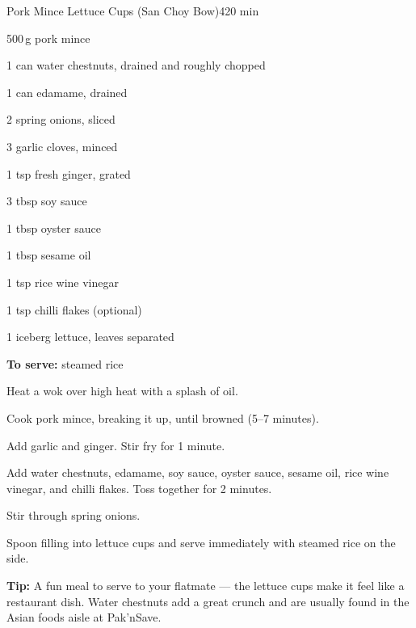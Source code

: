 \begin{recipebox}{Pork Mince Lettuce Cups (San Choy Bow)}{4}{20 min}
\begin{ingredients}
  \item 500\,g pork mince
  \item 1 can water chestnuts, drained and roughly chopped
  \item 1 can edamame, drained
  \item 2 spring onions, sliced
  \item 3 garlic cloves, minced
  \item 1 tsp fresh ginger, grated
  \item 3 tbsp soy sauce
  \item 1 tbsp oyster sauce
  \item 1 tbsp sesame oil
  \item 1 tsp rice wine vinegar
  \item 1 tsp chilli flakes (optional)
  \item 1 iceberg lettuce, leaves separated
  \item \textbf{To serve:} steamed rice
\end{ingredients}

\begin{method}
  \item Heat a wok over high heat with a splash of oil.
  \item Cook pork mince, breaking it up, until browned (5--7 minutes).
  \item Add garlic and ginger. Stir fry for 1 minute.
  \item Add water chestnuts, edamame, soy sauce, oyster sauce, sesame oil, rice wine vinegar, and chilli flakes. Toss together for 2 minutes.
  \item Stir through spring onions.
  \item Spoon filling into lettuce cups and serve immediately with steamed rice on the side.
\end{method}


\begin{notelist}
  \item \textbf{Tip:} A fun meal to serve to your flatmate --- the lettuce cups make it feel like a restaurant dish. Water chestnuts add a great crunch and are usually found in the Asian foods aisle at Pak'nSave.
\end{notelist}
\end{recipebox}
